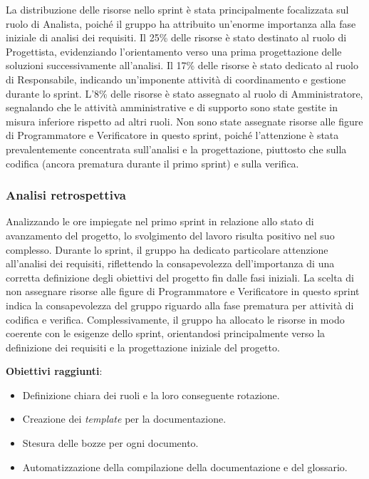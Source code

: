 La distribuzione delle risorse nello sprint è stata principalmente focalizzata sul ruolo di Analista, poiché il gruppo ha attribuito 
un'enorme importanza alla fase iniziale di analisi dei requisiti.
Il 25\% delle risorse è stato destinato al ruolo di Progettista, evidenziando l'orientamento verso una prima progettazione delle soluzioni 
successivamente all'analisi.
Il 17\% delle risorse è stato dedicato al ruolo di Responsabile, indicando un'imponente attività di coordinamento e gestione durante lo 
sprint.
L'8\% delle risorse è stato assegnato al ruolo di Amministratore, segnalando che le attività amministrative e di supporto sono state gestite
in misura inferiore rispetto ad altri ruoli.
Non sono state assegnate risorse alle figure di Programmatore e Verificatore in questo sprint, poiché l'attenzione è stata prevalentemente 
concentrata sull'analisi e la progettazione, piuttosto che sulla codifica (ancora prematura durante il primo sprint) e sulla verifica.

\subsubsection{Analisi retrospettiva}

Analizzando le ore impiegate nel primo sprint in relazione allo stato di avanzamento del progetto, lo svolgimento del lavoro risulta positivo nel suo complesso. 
Durante lo sprint, il gruppo ha dedicato particolare attenzione all'analisi dei requisiti, riflettendo la consapevolezza dell'importanza di una corretta definizione degli 
obiettivi del progetto fin dalle fasi iniziali.
La scelta di non assegnare risorse alle figure di Programmatore e Verificatore in questo sprint indica la consapevolezza del gruppo riguardo alla fase prematura per 
attività di codifica e verifica. Complessivamente, il gruppo ha allocato le risorse in modo coerente con le esigenze dello sprint, orientandosi principalmente verso la definizione 
dei requisiti e la progettazione iniziale del progetto.

\textbf{Obiettivi raggiunti}:
\begin{itemize}
	\item Definizione chiara dei ruoli e la loro conseguente rotazione.
	\item Creazione dei \textit{template} per la documentazione.
	\item Stesura delle bozze per ogni documento.
	\item Automatizzazione della compilazione della documentazione e del glossario.
\end{itemize}

